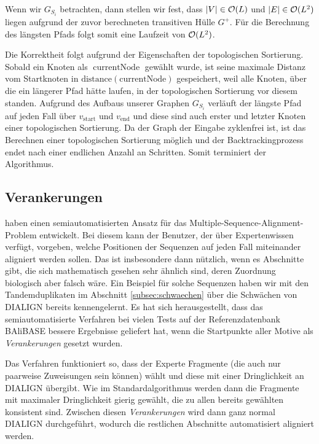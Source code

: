 Wenn wir $G_{S_i}$ betrachten, dann stellen wir fest, dass $|V| \in \mathcal{O}(L)$ und $|E| \in \mathcal{O}(L^2)$ liegen aufgrund der zuvor berechneten transitiven Hülle $G^{+}$. Für die Berechnung des längsten Pfads folgt somit eine Laufzeit von $\mathcal{O}(L^2)$.

Die Korrektheit folgt aufgrund der Eigenschaften der topologischen Sortierung. Sobald ein Knoten als $\operatorname{currentNode}$ gewählt wurde, ist seine maximale Distanz vom Startknoten in $\operatorname{distance(currentNode)}$ gespeichert, weil alle Knoten, über die ein längerer Pfad hätte laufen, in der topologischen Sortierung vor diesem standen. Aufgrund des Aufbaus unserer Graphen $G_{S_i}$ verläuft der längste Pfad auf jeden Fall über $v_{\operatorname{start}}$ und $v_{\operatorname{end}}$ und diese sind auch erster und letzter Knoten einer topologischen Sortierung. Da der Graph der Eingabe zyklenfrei ist, ist das Berechnen einer topologischen Sortierung möglich und der Backtrackingprozess endet nach einer endlichen Anzahl an Schritten. Somit terminiert der Algorithmus.

\subsection{Verankerungen}

\cite{mpps06} haben einen semiautomatisierten Ansatz für das Multiple-Sequence-Alignment-Problem entwickelt. Bei diesem kann der Benutzer, der über Expertenwissen verfügt, vorgeben, welche Positionen der Sequenzen auf jeden Fall miteinander aligniert werden sollen. Das ist insbesondere dann nützlich, wenn es Abschnitte gibt, die sich mathematisch gesehen sehr ähnlich sind, deren Zuordnung biologisch aber falsch wäre. Ein Beispiel für solche Sequenzen haben wir mit den Tandemduplikaten im Abschnitt \ref{subsec:schwaechen} über die Schwächen von DIALIGN bereits kennengelernt. Es hat sich herausgestellt, dass das semiautomatisierte Verfahren bei vielen Tests auf der Referenzdatenbank BAliBASE bessere Ergebnisse geliefert hat, wenn die Startpunkte aller Motive als \emph{Verankerungen} gesetzt wurden.

Das Verfahren funktioniert so, dass der Experte Fragmente (die auch nur paarweise Zuweisungen sein können) wählt und diese mit einer Dringlichkeit an DIALIGN übergibt. Wie im Standardalgorithmus werden dann die Fragmente mit maximaler Dringlichkeit gierig gewählt, die zu allen bereits gewählten konsistent sind. Zwischen diesen \emph{Verankerungen} wird dann ganz normal DIALIGN durchgeführt, wodurch die restlichen Abschnitte automatisiert aligniert werden.


